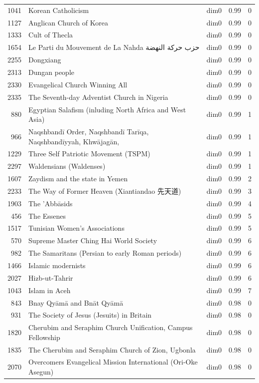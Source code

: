 \begin{tabular}{rllrr}
1041 & Korean Catholicism & dim0 & 0.99 & 0 \\
1127 & Anglican Church of Korea & dim0 & 0.99 & 0 \\
1333 & Cult of Thecla & dim0 & 0.99 & 0 \\
1654 & Le Parti du Mouvement de La Nahda حزب حركة النهضة & dim0 & 0.99 & 0 \\
2255 & Dongxiang & dim0 & 0.99 & 0 \\
2313 & Dungan people & dim0 & 0.99 & 0 \\
2330 & Evangelical Church Winning All & dim0 & 0.99 & 0 \\
2335 & The Seventh-day Adventist Church in Nigeria & dim0 & 0.99 & 0 \\
880 & Egyptian Salafism (inluding North Africa and West Asia) & dim0 & 0.99 & 1 \\
966 & Naqshbandī Order, Naqshbandī Tarīqa, Naqshbandīyyah, Khwājagān, & dim0 & 0.99 & 1 \\
1229 & Three Self Patriotic Movement (TSPM) & dim0 & 0.99 & 1 \\
2297 & Waldensians (Waldenses) & dim0 & 0.99 & 1 \\
1607 & Zaydism and the state in Yemen & dim0 & 0.99 & 2 \\
2233 & The Way of Former Heaven (Xiantiandao 先天道) & dim0 & 0.99 & 3 \\
1903 & The 'Abbāsids & dim0 & 0.99 & 4 \\
456 & The Essenes & dim0 & 0.99 & 5 \\
1517 & Tunisian Women's Associations & dim0 & 0.99 & 5 \\
570 & Supreme Master Ching Hai World Society & dim0 & 0.99 & 6 \\
982 & The Samaritans (Persian to early Roman periods) & dim0 & 0.99 & 6 \\
1466 & Islamic modernists & dim0 & 0.99 & 6 \\
2027 & Hizb-ut-Tahrir & dim0 & 0.99 & 6 \\
1043 & Islam in Aceh & dim0 & 0.99 & 7 \\
843 & Bnay Qyāmā and Bnāt Qyāmā & dim0 & 0.98 & 0 \\
931 & The Society of Jesus (Jesuits) in Britain & dim0 & 0.98 & 0 \\
1820 & Cherubim and Seraphim Church Unification, Campus Fellowship & dim0 & 0.98 & 0 \\
1835 & The Cherubim and Seraphim Church of Zion, Ugbonla & dim0 & 0.98 & 0 \\
2070 & Overcomers Evangelical Mission International (Ori-Oke Asegun) & dim0 & 0.98 & 0 \\

\end{tabular}
